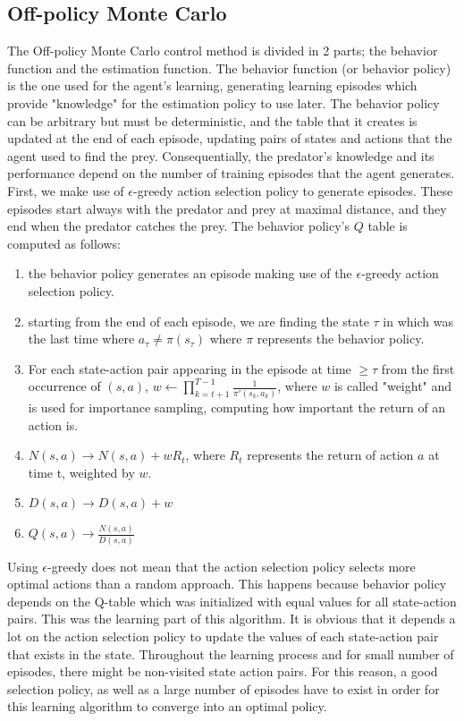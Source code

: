 \documentclass[a4paper,11pt]{article}
\begin{document}
\subsection*{Off-policy Monte Carlo}
The Off-policy Monte Carlo control method is divided in 2 parts; the behavior function and the estimation function. The behavior function (or behavior policy) is the one used for the agent's learning, generating learning episodes which provide "knowledge" for the estimation policy to use later. The behavior policy can be arbitrary but must be deterministic, and the table that it creates is updated at the end of each episode, updating pairs of states and actions that the agent used to find the prey. Consequentially, the predator's knowledge and its performance depend on the number of training episodes that the agent generates. First, we make use of $\epsilon$-greedy action selection policy to generate episodes. These episodes start always with the predator and prey at maximal distance, and they end when the predator catches the prey. The behavior policy's $Q$ table is computed as follows: 
\begin{enumerate}
\item the behavior policy generates an episode making use of the $\epsilon$-greedy action selection policy.

\item starting from the end of each episode, we are finding the state $\tau$ in which was the last time where $a_\tau \neq \pi(s_\tau)$ where $\pi$ represents the behavior policy.

\item For each state-action pair appearing in the episode at time $\geq \tau$ from the first occurrence of $(s,a)$, $w \leftarrow \prod^{T-1}_{k=t+1}\frac{1}{\pi '(s_k,a_k)}$, where $w$ is called "weight" and is used for importance sampling, computing how important the return of an action is.

\item $N(s,a) \rightarrow N(s,a) + wR_t$,  where $R_t$ represents the return of action $a$ at time t, weighted by $w$.

\item $D(s,a) \rightarrow D(s,a) + w$

\item $Q(s,a) \rightarrow \frac{N(s,a)}{D(s,a)}$
\end{enumerate}

Using $\epsilon$-greedy does not mean that the action selection policy selects more optimal actions than a random approach. This happens because behavior policy depends on the Q-table  which was initialized with equal values for all state-action pairs. This was the learning part of this algorithm. It is obvious that it depends a lot on the action selection policy to update the values of each state-action pair that exists in the state. Throughout the learning process and for small number of episodes, there might be non-visited state action pairs. For this reason, a good selection policy, as well as a large number of episodes have to exist in order for this learning algorithm to converge into an optimal policy.
\end{document}
